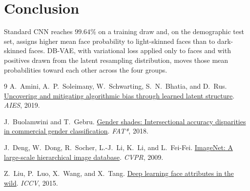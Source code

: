 \documentclass[14pt]{extarticle}
\begin{document}
\clearpage
\section{Conclusion}
Standard CNN reaches \(99.64\%\) on a training draw and, on the demographic test set, assigns higher mean face probability to light-skinned faces than to dark-skinned faces. DB-VAE, with variational loss applied only to faces and with positives drawn from the latent resampling distribution, moves those mean probabilities toward each other across the four groups.

\clearpage
{}
\begin{thebibliography}{9}
A.~Amini, A.~P.~Soleimany, W.~Schwarting, S.~N.~Bhatia, and D.~Rus.
\href{https://aies-conference.com/2019/wp-content/papers/main/AIES-19_paper_220.pdf}{Uncovering and mitigating algorithmic bias through learned latent structure}.
\emph{AIES}, 2019.

J.~Buolamwini and T.~Gebru.
\href{https://proceedings.mlr.press/v81/buolamwini18a/buolamwini18a.pdf}{Gender shades: Intersectional accuracy disparities in commercial gender classification}.
\emph{FAT*}, 2018.

J.~Deng, W.~Dong, R.~Socher, L.-J.~Li, K.~Li, and L.~Fei-Fei.
\href{https://image-net.org/static_files/papers/imagenet_cvpr09.pdf}{ImageNet: A large-scale hierarchical image database}.
\emph{CVPR}, 2009.

Z.~Liu, P.~Luo, X.~Wang, and X.~Tang.
\href{https://arxiv.org/pdf/1411.7766.pdf}{Deep learning face attributes in the wild}.
\emph{ICCV}, 2015.
\end{thebibliography}
\end{document}
